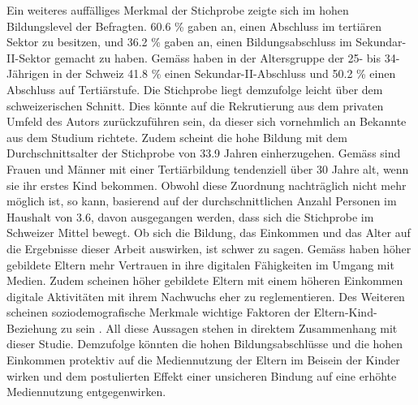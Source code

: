 Ein weiteres auffälliges Merkmal der Stichprobe zeigte sich im hohen Bildungslevel der Befragten. 60.6 \% gaben an, einen Abschluss im tertiären Sektor zu besitzen, und 36.2 \% gaben an, einen Bildungsabschluss im Sekundar-II-Sektor gemacht zu haben. Gemäss  haben in der Altersgruppe der 25- bis 34-Jährigen in der Schweiz 41.8 \% einen Sekundar-II-Abschluss und 50.2 \% einen Abschluss auf Tertiärstufe. Die Stichprobe liegt demzufolge leicht über dem schweizerischen Schnitt. Dies könnte auf die Rekrutierung aus dem privaten Umfeld des Autors zurückzuführen sein, da dieser sich vornehmlich an Bekannte aus dem Studium richtete. Zudem scheint die hohe Bildung mit dem Durchschnittsalter der Stichprobe von 33.9 Jahren einherzugehen. Gemäss  sind  Frauen und Männer mit einer Tertiärbildung tendenziell über 30 Jahre alt, wenn sie ihr erstes Kind bekommen. Obwohl diese Zuordnung nachträglich nicht mehr möglich ist, so kann, basierend auf der durchschnittlichen Anzahl Personen im Haushalt von 3.6, davon ausgegangen werden, dass sich die Stichprobe im Schweizer Mittel bewegt. Ob sich die Bildung, das Einkommen und das Alter auf die Ergebnisse dieser Arbeit auswirken, ist schwer zu sagen. Gemäss  haben höher gebildete Eltern mehr Vertrauen in ihre digitalen Fähigkeiten im Umgang mit Medien. Zudem scheinen höher gebildete Eltern mit einem höheren Einkommen digitale Aktivitäten mit ihrem Nachwuchs eher zu reglementieren. Des Weiteren scheinen soziodemografische Merkmale wichtige Faktoren der Eltern-Kind-Beziehung zu sein \cite{Kammerl2012}. All diese Aussagen stehen in direktem Zusammenhang mit dieser Studie. Demzufolge könnten die hohen Bildungsabschlüsse und die hohen Einkommen protektiv auf die Mediennutzung der Eltern im Beisein der Kinder wirken und dem postulierten Effekt einer unsicheren Bindung auf eine erhöhte Mediennutzung entgegenwirken. 

